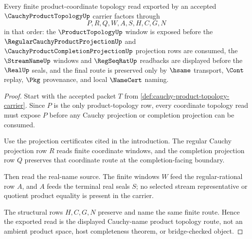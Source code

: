 \begin{theorem}
\label{thm:cauchy-product-topology-finite-product-readback}
Every finite product-coordinate topology read exported by an accepted $\CauchyProductTopologyUp$ carrier factors through
$$
P,R,Q,W,A,S,H,C,G,N
$$
in that order: the $\ProductTopologyUp$ window is exposed before the $\RegularCauchyProductProjectionUp$ and $\CauchyProductCompletionProjectionUp$ projection rows are consumed, the $\StreamNameUp$ windows and $\RegSeqRatUp$ readbacks are displayed before the $\RealUp$ seals, and the final route is preserved only by $\hsame$ transport, $\Cont$ replay, $\Pkg$ provenance, and local $\NameCert$ naming.
\end{theorem}
\begin{proof}
Start with the accepted packet $T$ from \autoref{def:cauchy-product-topology-carrier}. Since $P$ is the only product-topology row, every coordinate topology read must expose $P$ before any Cauchy projection or completion projection can be consumed.

Use the projection certificates cited in the introduction. The regular Cauchy projection row $R$ reads finite coordinate windows, and the completion projection row $Q$ preserves that coordinate route at the completion-facing boundary.

Then read the real-name source. The finite windows $W$ feed the regular-rational row $A$, and $A$ feeds the terminal real seals $S$; no selected stream representative or quotient product equality is present in the carrier.

The structural rows $H,C,G,N$ preserve and name the same finite route. Hence the exported read is the displayed Cauchy-name product topology route, not an ambient product space, host completeness theorem, or bridge-checked object.
\end{proof}



